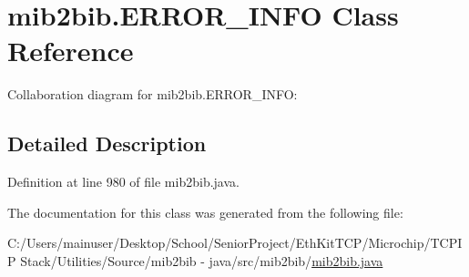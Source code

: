 \hypertarget{classmib2bib_1_1mib2bib_1_1_e_r_r_o_r___i_n_f_o}{}\section{mib2bib.\+E\+R\+R\+O\+R\+\_\+\+I\+N\+F\+O Class Reference}
\label{classmib2bib_1_1mib2bib_1_1_e_r_r_o_r___i_n_f_o}


Collaboration diagram for mib2bib.\+E\+R\+R\+O\+R\+\_\+\+I\+N\+F\+O\+:


\subsection{Detailed Description}


Definition at line 980 of file mib2bib.\+java.



The documentation for this class was generated from the following file\+:\begin{DoxyCompactItemize}
\item 
C\+:/\+Users/mainuser/\+Desktop/\+School/\+Senior\+Project/\+Eth\+Kit\+T\+C\+P/\+Microchip/\+T\+C\+P\+I\+P Stack/\+Utilities/\+Source/mib2bib -\/ java/src/mib2bib/\hyperlink{mib2bib_8java}{mib2bib.\+java}\end{DoxyCompactItemize}
